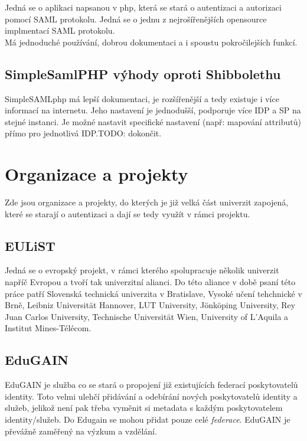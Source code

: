 Jedná se o aplikaci napsanou v php, která se stará o autentizaci a autorizaci pomocí SAML protokolu. Jedná se o jednu z nejrošířenějších opensource implmentací SAML protokolu.\\

Má jednoduché používání, dobrou dokumentaci a i spoustu pokročilejších funkcí.\cite{simplesamlphpdoc}

\section{SimpleSamlPHP výhody oproti Shibbolethu} %

SimpleSAMLphp má lepší dokumentaci, je rozšířenější a tedy existuje i více informací na internetu. Jeho nastavení je jednodušší, podporuje více IDP a SP na stejné instanci. Je možné nastavit specifické nastavení (např: mapování attributů) přímo pro jednotlivá IDP.TODO: dokončit.

\chapter{Organizace a projekty} %

Zde jsou organizace a projekty, do kterých je již velká část univerzit zapojená, které se starají o autentizaci a dají se tedy využít v rámci projektu.

\section{EULiST} %
Jedná se o evropský projekt, v rámci kterého spolupracuje několik univerzit napříč Evropou a tvoří tak univerzitní alianci. Do této aliance v době psaní této práce patří Slovenská technická univerzita v Bratislave, Vysoké učení tehchnické v Brně,  Leibniz Universität Hannover, LUT University, Jönköping University, Rey Juan Carlos University, Technische Universität Wien, University of L’Aquila a Institut Mines-Télécom.\cite{eulist}

\section{EduGAIN} %

EduGAIN je služba co se stará o propojení již existujících federací poskytovatelů identity. Toto velmi ulehčí přidávání a odebírání nových poskytovatelů identity a služeb, jelikož není pak třeba vyměnit si metadata s každým poskytovatelem identity/služeb. Do Edugain se mohou přidat pouze celé \emph{federace}. \cite{edugainWikipedie}\cite{edugain}
EduGAIN je převážně zaměřený na výzkum a vzdělání.

